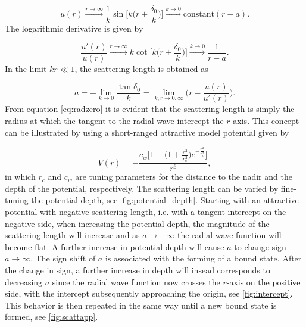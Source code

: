 \documentclass{article}
\numberwithin{equation}{section}
\numberwithin{figure}{section}
\begin{document}
\begin{equation}\label{eq:radzero}
u(r) \xrightarrow{ r \to \infty} \frac{1}{k} \sin\bigg[k\Big(r+\frac{\delta_0}{k}\Big)\bigg]  \xrightarrow{k \to 0} \text{constant}(r-a).
\end{equation}
The logarithmic derivative is given by

\begin{equation}
\frac{u'(r)}{u(r)}  \xrightarrow{ r \to \infty} k \cot\bigg[k \Big(r + \frac{\delta_0}{k}\Big)\bigg] \xrightarrow{k \to 0} \frac{1}{r-a}.
\end{equation}
In the limit $kr \ll 1$, the scattering length is obtained as

\begin{equation}
a = -\lim_{k \to 0} \frac{\tan \delta_0 }{k} = \lim_{k,r \to 0,\infty}\Bigg(r-  \frac{u(r)}{u'(r)}\Bigg).
\end{equation}
From equation \eqref{eq:radzero} it is evident that the scattering length is simply the radius at which the tangent to the radial wave intercept the $r$-axis. This concept can be illustrated by using a short-ranged attractive model potential given by

\begin{equation}\label{modelpotential}
V(r) = -\frac{c_w\bigg[1-\Big(1 + \frac{r^2}{r_c^2}\Big)e^{-\frac{r^2}{r_c^2}}\bigg]}{r^6},
\end{equation}
in which $r_c$ and $c_w$ are tuning parameters for the distance to the nadir and the depth of the potential, respectively. The scattering length can be varied by fine-tuning the potential depth, see \cref{fig:potential_depth}. Starting with an attractive potential with negative scattering length, i.e. with a tangent intercept on the negative side, when increasing the potential depth, the magnitude of the scattering length will increase and as $a \rightarrow -\infty$ the radial wave function will become flat. A further increase in potential depth will cause $a$ to change sign $a \rightarrow \infty$. The sign shift of $a$ is associated with the forming of a bound state. After the change in sign, a further increase in depth will insead corresponds to decreasing $a$ since the radial wave function now crosses the $r$-axis on the positive side, with the intercept subsequently approaching the origin, see \cref{fig:intercept}. This behavior is then repeated in the same way until a new bound state is formed, see \cref{fig:scattapp}.
\end{document}
